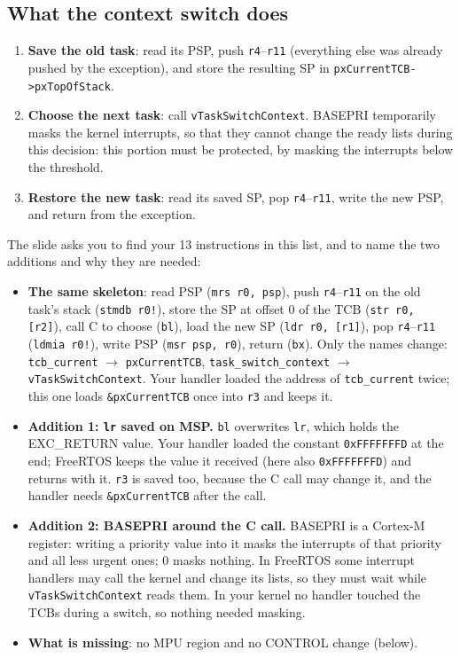 \subsection{What the context switch does}
\begin{enumerate}
    \item \textbf{Save the old task}: read its PSP, push \texttt{r4}--\texttt{r11} (everything else was already pushed by the exception), and store the resulting SP in \texttt{pxCurrentTCB->pxTopOfStack}.
    \item \textbf{Choose the next task}: call \texttt{vTaskSwitchContext}. BASEPRI temporarily masks the kernel interrupts, so that they cannot change the ready lists during this decision: this portion must be protected, by masking the interrupts below the threshold.
    \item \textbf{Restore the new task}: read its saved SP, pop \texttt{r4}--\texttt{r11}, write the new PSP, and return from the exception.
\end{enumerate}
The slide asks you to find your 13 instructions in this list, and to name the two additions and why they are needed:
\begin{itemize}
    \item \textbf{The same skeleton}: read PSP (\texttt{mrs r0, psp}), push \texttt{r4}--\texttt{r11} on the old task's stack (\texttt{stmdb r0!}), store the SP at offset 0 of the TCB (\texttt{str r0, [r2]}), call C to choose (\texttt{bl}), load the new SP (\texttt{ldr r0, [r1]}), pop \texttt{r4}--\texttt{r11} (\texttt{ldmia r0!}), write PSP (\texttt{msr psp, r0}), return (\texttt{bx}). Only the names change: \texttt{tcb\_current} $\to$ \texttt{pxCurrentTCB}, \texttt{task\_switch\_context} $\to$ \texttt{vTaskSwitchContext}. Your handler loaded the address of \texttt{tcb\_current} twice; this one loads \texttt{\&pxCurrentTCB} once into \texttt{r3} and keeps it.
    \item \textbf{Addition 1: \texttt{lr} saved on MSP.} \texttt{bl} overwrites \texttt{lr}, which holds the EXC\_RETURN value. Your handler loaded the constant \texttt{0xFFFFFFFD} at the end; FreeRTOS keeps the value it received (here also \texttt{0xFFFFFFFD}) and returns with it. \texttt{r3} is saved too, because the C call may change it, and the handler needs \texttt{\&pxCurrentTCB} after the call.
    \item \textbf{Addition 2: BASEPRI around the C call.} BASEPRI is a Cortex-M register: writing a priority value into it masks the interrupts of that priority and all less urgent ones; 0 masks nothing. In FreeRTOS some interrupt handlers may call the kernel and change its lists, so they must wait while \texttt{vTaskSwitchContext} reads them. In your kernel no handler touched the TCBs during a switch, so nothing needed masking.
    \item \textbf{What is missing}: no MPU region and no CONTROL change (below).
\end{itemize}
